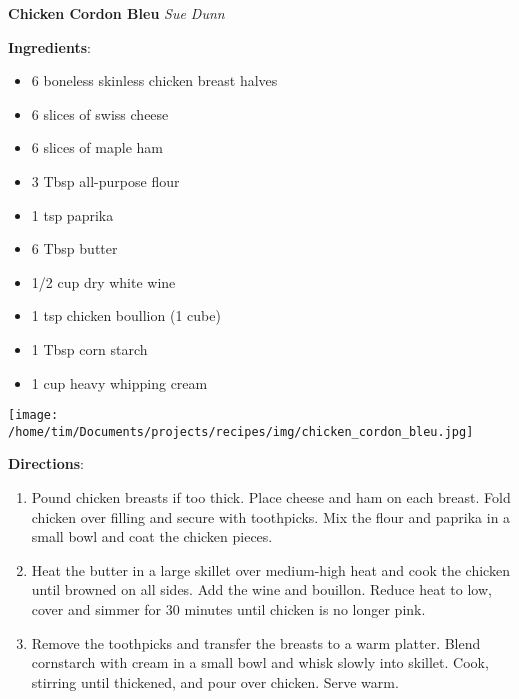 \documentclass[11pt, twoside, openany]{book}
\begin{document}
\noindent\begin{minipage}[t]{\linewidth}%
{\Large\textbf{Chicken Cordon Bleu}} \label{chicken-cordon-bleu}\hfill\textit{Sue Dunn}\\
\noindent\begin{minipage}[t]{0.78\linewidth}%
\textbf{Ingredients}:\vspace{-3mm}
\begin{multicols}{2}
\begin{itemize}\setlength\itemsep{-1mm}
\item 6 boneless skinless chicken breast halves
\item 6 slices of swiss cheese
\item 6 slices of maple ham
\item 3 Tbsp all-purpose flour
\item 1 tsp paprika
\item 6 Tbsp butter
\item 1/2 cup dry white wine
\item 1 tsp chicken boullion (1 cube)
\item 1 Tbsp corn starch
\item 1 cup heavy whipping cream
\end{itemize}
\end{multicols}
\end{minipage}
\noindent\begin{minipage}[t]{0.18\linewidth}
\centering \strut\vspace*{-\baselineskip}\newline
\texttt{[image: /home/tim/Documents/projects/recipes/img/chicken\_cordon\_bleu.jpg]}\\
\end{minipage}\vspace{3mm}
\textbf{Directions}:
\vspace{-3mm}\begin{enumerate}\setlength\itemsep{-1mm}
\item Pound chicken breasts if too thick. Place cheese and ham on each breast. Fold chicken over filling and secure with toothpicks. Mix the flour and paprika in a small bowl and coat the chicken pieces.
\item Heat the butter in a large skillet over medium-high heat and cook the chicken until browned on all sides. Add the wine and bouillon. Reduce heat to low, cover and simmer for 30 minutes until chicken is no longer pink.
\item Remove the toothpicks and transfer the breasts to a warm platter. Blend cornstarch with cream in a small bowl and whisk slowly into skillet. Cook, stirring until thickened, and pour over chicken. Serve warm. 
\end{enumerate}
\end{minipage}\vspace{8mm}
\end{document}
